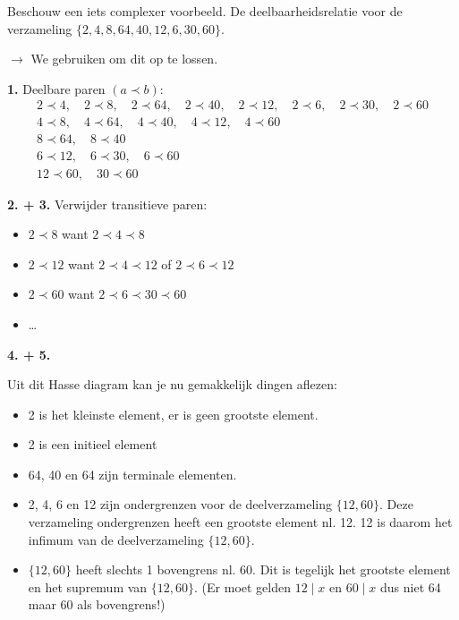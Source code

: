 \textbf{} Beschouw een iets complexer voorbeeld. De deelbaarheidsrelatie voor de verzameling $\{2,4,8,64,40,12,6,30,60\}$.

$\to$ We gebruiken  om dit op te lossen.

\textbf{1.} Deelbare paren $(a \prec b)$:
\begin{equation*}
    \begin{gathered}
        2 \prec 4, \quad 2 \prec 8, \quad 2 \prec 64, \quad 2 \prec 40, \quad 2 \prec 12, \quad 2 \prec 6, \quad 2 \prec 30, \quad 2 \prec 60 \\[1ex]
        4 \prec 8, \quad 4 \prec 64, \quad 4 \prec 40, \quad 4 \prec 12, \quad 4 \prec 60 \\[1ex]
        8 \prec 64, \quad 8 \prec 40 \\[1ex]
        6 \prec 12, \quad 6 \prec 30, \quad 6 \prec 60 \\[1ex]
        12 \prec 60, \quad 30 \prec 60
    \end{gathered}
\end{equation*}

\textbf{2. + 3.} Verwijder transitieve paren:
\begin{itemize}
    \item $2 \prec 8$ want $2 \prec 4 \prec 8$
    \item $2 \prec 12$ want $2 \prec 4 \prec 12$ of $2 \prec 6 \prec 12$
    \item $2 \prec 60$ want $2 \prec 6 \prec 30 \prec 60$
    \item \dots
\end{itemize}

\textbf{4. + 5.}
\begin{center}
\resizebox{0.50\textwidth}{!}{%
    
}
\end{center}

Uit dit Hasse diagram kan je nu gemakkelijk dingen aflezen:
\begin{itemize}
    \item 2 is het kleinste element, er is geen grootste element.
    \item 2 is een initieel element
    \item 64, 40 en 64 zijn terminale elementen.
    \item 2, 4, 6 en 12 zijn ondergrenzen voor de deelverzameling $\{12, 60\}$. Deze verzameling ondergrenzen heeft een grootste element nl. 12. 12 is daarom het infimum van de deelverzameling $\{12, 60\}$.
    \item $\{12, 60\}$ heeft slechts 1 bovengrens nl. 60. Dit is tegelijk het grootste element en het supremum van $\{12, 60\}$. (Er moet gelden $12 \mid x$ en $60 \mid x$ dus niet 64 maar 60 als bovengrens!)
\end{itemize}

